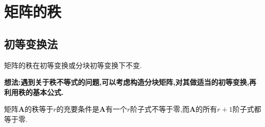 \documentclass[lang=cn,newtx,10pt,scheme=chinese]{elegantbook}
\begin{document}
\section{矩阵的秩}

\subsection{初等变换法}

矩阵的秩在初等变换或分块初等变换下不变.

\textbf{想法:遇到关于秩不等式的问题,可以考虑构造分块矩阵,对其做适当的初等变换,再利用秩的基本公式.}

\begin{theorem}\label{theorem:矩阵的秩与子式}
    矩阵\(\boldsymbol{A}\)的秩等于\(r\)的充要条件是\(\boldsymbol{A}\)有一个\(r\)阶子式不等于零,而\(\boldsymbol{A}\)的所有\(r + 1\)阶子式都等于零.
\end{theorem}
\end{document}

